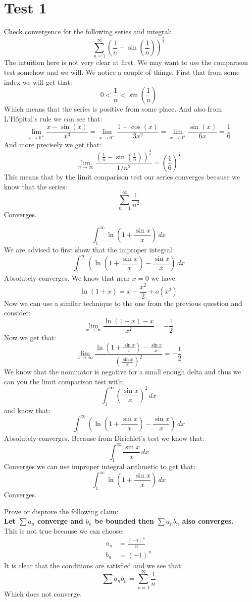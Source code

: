 \documentclass[11pt,a4paper]{article}
\begin{document}
	\section{Test 1}
	Check convergence for the following series and integral:
	\[
		\sum_{n=1}^{\infty}
		{\left(\frac{1}{n} - \sin\left(\frac{1}{n}\right)\right)}^{\frac 23}
	\]
	The intuition here is not very clear at first. We may want to use
	the comparison test somehow and we will. We notice a couple of things.
	First that from some index we will get that:
	\[
		0 < \frac{1}{n} < \sin\left(\frac{1}{n}\right)
	\]
	Which means that the series is positive from some place. And also
	from L'H\^opital's rule we can see that:
	\[
		\lim_{x\to0^+}{\frac{x - \sin(x)}{x^3}} = 
		\lim_{x\to0^+}{\frac{1 - \cos(x)}{3x^2}} = 
		\lim_{x\to0^+}{\frac{\sin(x)}{6x}} = \frac{1}{6}
	\]
	And more precisely we get that:
	\[
		\lim_{n\to\infty}
		{\frac{(\frac{1}{n} - \sin\left(\frac{1}{n}\right))
		^{\frac{2}{3}}}{1/n^2}} = \left(\frac{1}{6}\right)^{\frac{2}{3}}
	\]
	This means that by the limit comparison test our series converges
	because we know that the series:
	\[
		\sum_{n=1}^{\infty}{\frac{1}{n^2}}
	\]
	Converges.
	
	\newpage
	
	\[
		\int_{1}^{\infty}{\ln\left(1+\frac{\sin x}{x}\right)\,dx}
	\]
	We are advised to first show that the improper integral:
	\[
		\int_{1}^{\infty}{\left(\ln\left(1+\frac{\sin x}{x}\right)
		- \frac{\sin x}{x}\right)\,dx}
	\]
	Absolutely converges. We know that near $x = 0$ we have:
	\[
		\ln(1+x) = x - \frac{x^2}{2} + o(x^2)
	\]
	Now we can use a similar technique to the one from the previous question
	and consider:
	\[
		\lim_{x\to\infty}{\frac{\ln(1+x) - x}{x^2}} = -\frac 12
	\]
	Now we get that:
	\[
		\lim_{x\to\infty}
		{\frac{\ln(1+\frac{\sin x}{x}) - \frac{\sin x}{x}}
		{(\frac{\sin x}{x})^2}} 
		= -\frac 12
	\]
	We know that the nominator is negative for a small enough delta
	and thus we can you the limit comparison test with:
	\[
		\int_{1}^{\infty}{\left(\frac{\sin x}{x}\right)^2\,dx}
	\]
	and know that:
	\[
		\int_{1}^{\infty}{\left(\ln\left(1+\frac{\sin x}{x}\right)
		- \frac{\sin x}{x}\right)\,dx}
	\]
	Absolutely converges. Because from Dirichlet's test we know that:
	\[
		\int_{1}^{\infty}{\frac{\sin x}{x}\,dx}
	\]
	Converges we can use improper integral arithmetic to get that:
	\[
		\int_{1}^{\infty}{\ln\left(1+\frac{\sin x}{x}\right)\,dx}
	\]
	Converges.
	
	\newpage
	
	Prove or disprove the following claim: \\
	\textbf{Let $\sum{a_n}$ converge and $b_n$ be bounded then 
	$\sum{a_n b_n}$ also converges.} \\
	This is not true because we can choose:
	\begin{align*}
		a_n &= \frac{(-1)^n}{n} \\
		b_n &= (-1)^n
	\end{align*}
	It is clear that the conditions are satisfied and we see that:
	\[
		\sum{a_n b_n} = \sum_{n=1}^{\infty}{\frac{1}{n}}
	\]
	Which does not converge.
	
\end{document}
